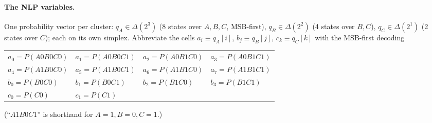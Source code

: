 \documentclass[11pt]{article}
\begin{document}
\paragraph{The NLP variables.} One probability vector per cluster:
$q_A\in\Delta(2^3)$ (8 states over $A,B,C$, MSB-first), $q_B\in\Delta(2^2)$ (4 states over
$B,C$), $q_C\in\Delta(2^1)$ (2 states over $C$); each on its own simplex. Abbreviate the cells
$a_i\equiv q_A[i]$, $b_j\equiv q_B[j]$, $c_k\equiv q_C[k]$ with the MSB-first decoding
\begin{center}\footnotesize
\begin{tabular}{llll}
  \toprule
  $a_0{=}P(A0B0C0)$ & $a_1{=}P(A0B0C1)$ & $a_2{=}P(A0B1C0)$ & $a_3{=}P(A0B1C1)$ \\
  $a_4{=}P(A1B0C0)$ & $a_5{=}P(A1B0C1)$ & $a_6{=}P(A1B1C0)$ & $a_7{=}P(A1B1C1)$ \\
  \midrule
  $b_0{=}P(B0C0)$ & $b_1{=}P(B0C1)$ & $b_2{=}P(B1C0)$ & $b_3{=}P(B1C1)$ \\
  $c_0{=}P(C0)$ & $c_1{=}P(C1)$ & & \\
  \bottomrule
\end{tabular}
\end{center}
(``$A1B0C1$'' is shorthand for $A{=}1,B{=}0,C{=}1$.)
\end{document}
